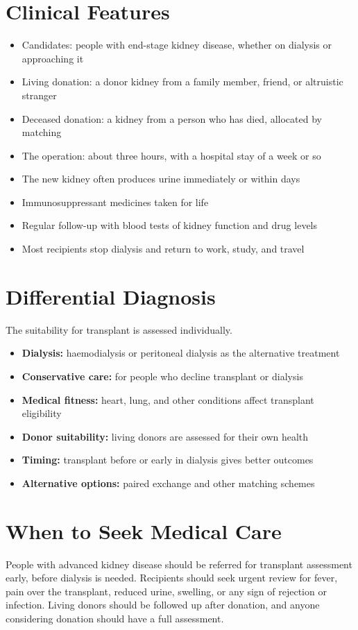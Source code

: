 \section*{Clinical Features}
\begin{itemize}
    \item Candidates: people with end-stage kidney disease, whether on dialysis or approaching it
    \item Living donation: a donor kidney from a family member, friend, or altruistic stranger
    \item Deceased donation: a kidney from a person who has died, allocated by matching
    \item The operation: about three hours, with a hospital stay of a week or so
    \item The new kidney often produces urine immediately or within days
    \item Immunosuppressant medicines taken for life
    \item Regular follow-up with blood tests of kidney function and drug levels
    \item Most recipients stop dialysis and return to work, study, and travel
\end{itemize}

\section*{Differential Diagnosis}
The suitability for transplant is assessed individually.
\begin{itemize}
    \item \textbf{Dialysis:} haemodialysis or peritoneal dialysis as the alternative treatment
    \item \textbf{Conservative care:} for people who decline transplant or dialysis
    \item \textbf{Medical fitness:} heart, lung, and other conditions affect transplant eligibility
    \item \textbf{Donor suitability:} living donors are assessed for their own health
    \item \textbf{Timing:} transplant before or early in dialysis gives better outcomes
    \item \textbf{Alternative options:} paired exchange and other matching schemes
\end{itemize}

\section*{When to Seek Medical Care}
People with advanced kidney disease should be referred for transplant assessment early, before dialysis is needed. Recipients should seek urgent review for fever, pain over the transplant, reduced urine, swelling, or any sign of rejection or infection. Living donors should be followed up after donation, and anyone considering donation should have a full assessment.


